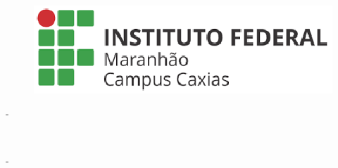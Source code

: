 \begin{figure}[h]
\centering
\includegraphics[scale=0.3]{imagens/logo.png}
\end{figure}

\begin{center}
\MakeUppercase{\dep} \hspace*{2mm}- \sigladep \\
  \MakeUppercase{\nomedocurso}
\end{center}

  \vspace*{2in}
  \begin{center}
    \LARGE\textbf{ \thetitle}\\
  \end{center}

  \vspace*{1in}

  \begin{center}
    {\MakeUppercase \theauthor}
  \end{center}

\vspace{1.5in}

\begin{samepage}
    \begin{center}
    \cidade \hspace*{2mm}- \siglaestado \\ \the\year
    \end{center}
\end{samepage}


\begin{center}
  {\MakeUppercase \theauthor}
\end{center}

\vspace{2in}

\begin{center}
  {\huge \thetitle}\\
\end{center}

\vspace{1in}

